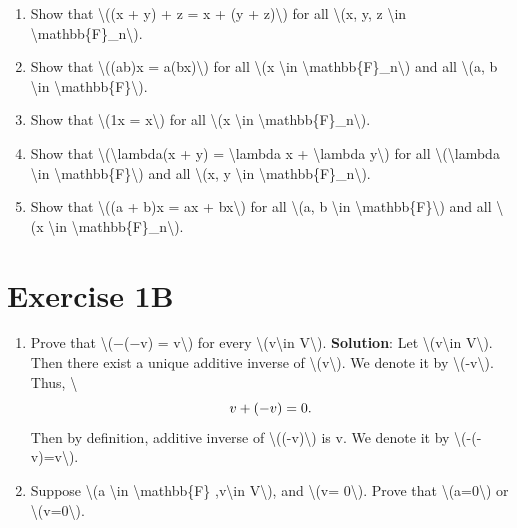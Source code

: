 \documentclass[
]{book}
\theoremstyle{definition}
\theoremstyle{definition}
\theoremstyle{definition}
\theoremstyle{definition}
\theoremstyle{remark}
\begin{document}
\begin{enumerate}
\def\labelenumi{\arabic{enumi}.}
\setcounter{enumi}{10}
\item
  Show that \textbackslash((x + y) + z = x + (y + z)\textbackslash) for all \textbackslash(x, y, z \textbackslash in \textbackslash mathbb\{F\}\_n\textbackslash).
\item
  Show that \textbackslash((ab)x = a(bx)\textbackslash) for all \textbackslash(x \textbackslash in \textbackslash mathbb\{F\}\_n\textbackslash) and all \textbackslash(a, b \textbackslash in \textbackslash mathbb\{F\}\textbackslash).
\item
  Show that \textbackslash(1x = x\textbackslash) for all \textbackslash(x \textbackslash in \textbackslash mathbb\{F\}\_n\textbackslash).
\item
  Show that \textbackslash(\textbackslash lambda(x + y) = \textbackslash lambda x + \textbackslash lambda y\textbackslash) for all \textbackslash(\textbackslash lambda \textbackslash in \textbackslash mathbb\{F\}\textbackslash) and all \textbackslash(x, y \textbackslash in \textbackslash mathbb\{F\}\_n\textbackslash).
\item
  Show that \textbackslash((a + b)x = ax + bx\textbackslash) for all \textbackslash(a, b \textbackslash in \textbackslash mathbb\{F\}\textbackslash) and all \textbackslash(x \textbackslash in \textbackslash mathbb\{F\}\_n\textbackslash).
\end{enumerate}

\section{Exercise 1B}\label{exercise-1b}

\begin{enumerate}
\def\labelenumi{\arabic{enumi}.}
\item
  Prove that \textbackslash(−(−v) = v\textbackslash) for every \textbackslash(v\textbackslash in V\textbackslash). \textbf{Solution}: Let \textbackslash(v\textbackslash in V\textbackslash). Then there exist a unique additive inverse of \textbackslash(v\textbackslash). We denote it by \textbackslash(-v\textbackslash). Thus, \textbackslash{}\[v+(-v)=0.\\\] Then by definition, additive inverse of \textbackslash((-v)\textbackslash) is v. We denote it by \textbackslash(-(-v)=v\textbackslash).
\item
  Suppose \textbackslash(a \textbackslash in \textbackslash mathbb\{F\} ,v\textbackslash in V\textbackslash), and \textbackslash(v= 0\textbackslash). Prove that \textbackslash(a=0\textbackslash) or \textbackslash(v=0\textbackslash).
\end{enumerate}
\end{document}
